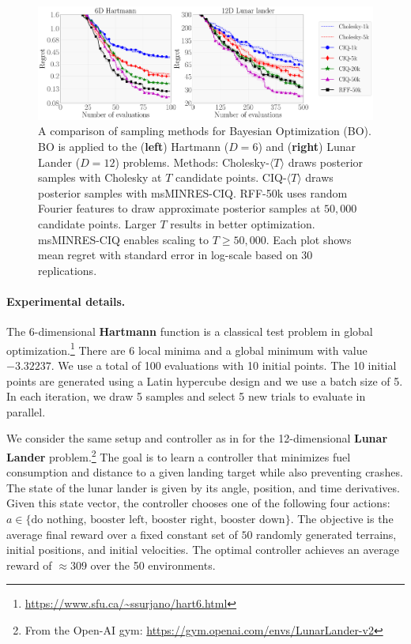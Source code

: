 \begin{figure}[t!]
  \centering
  \includegraphics[width=\linewidth]{figures/bo_ciq.pdf}
  \caption[
    Comparison of msMINRES-CIQ versus other sampling methods for Bayesian optimization via Thompson Sampling.
  ]{
    A comparison of sampling methods for Bayesian Optimization (BO).
    BO is applied to the ({\bf left}) Hartmann ($D=6$) and ({\bf right}) Lunar Lander ($D=12$) problems.
    Methods: Cholesky-$\langle T \rangle$ draws posterior samples with Cholesky at $T$ candidate points.
    CIQ-$\langle T \rangle$ draws posterior samples with msMINRES-CIQ.
    RFF-50k uses random Fourier features to draw approximate posterior samples at $50,\!000$ candidate points.
    Larger $T$ results in better optimization.
    msMINRES-CIQ enables scaling to $T \geq 50,\!000$.
    Each plot shows mean regret with standard error in log-scale based on 30 replications.
  }
  \label{fig:bayesopt}
\end{figure}

\paragraph{Experimental details.}
The 6-dimensional {\bf Hartmann} function is a classical test problem in global optimization.\footnote{\url{https://www.sfu.ca/~ssurjano/hart6.html}}
There are 6 local minima and a global minimum with value $-3.32237$.
We use a total of 100 evaluations with 10 initial points.
The 10 initial points are generated using a Latin hypercube design and we use a batch size of 5.
In each iteration, we draw 5 samples and select 5 new trials to evaluate in parallel.

We consider the same setup and controller as in \cite{eriksson2019scalable} for the 12-dimensional {\bf Lunar Lander} problem.\footnote{
 From the Open-AI gym: \url{https://gym.openai.com/envs/LunarLander-v2}
}
The goal is to learn a controller that minimizes fuel consumption and distance to a given landing target while also preventing crashes.
The state of the lunar lander is given by its angle, position, and time derivatives.
Given this state vector, the controller chooses one of the following four actions: $a \in \{\text{do nothing, booster left, booster right, booster down}\}$.
The objective is the average final reward over a fixed constant set of $50$ randomly generated terrains, initial positions, and initial velocities.
The optimal controller achieves an average reward of $\approx 309$ over the 50 environments.


